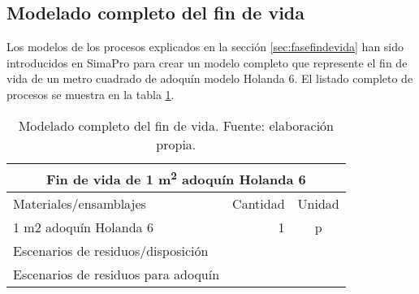 \subsection{Modelado completo del fin de vida}

Los modelos de los procesos explicados en la sección \ref{sec:fasefindevida} han sido introducidos en SimaPro para crear un modelo completo que represente el fin de vida de un metro cuadrado de adoquín modelo Holanda 6. El listado completo de procesos se muestra en la tabla \ref{modeladocompletofindevida}.

\begin{table}[!htb]
\centering
\begin{tabular}{p{8cm}rc}
\toprule
\multicolumn{3}{c}{Fin de vida de 1 \si{m^2} adoquín Holanda 6}\\
\midrule
Materiales/ensamblajes & Cantidad & Unidad\\
\midrule
1 m2 adoquín Holanda 6 & 1 & p\\
\midrule
Escenarios de residuos/disposición & & \\
\midrule
Escenarios de residuos para adoquín & & \\
\bottomrule
\end{tabular}
\caption[Modelado completo del fin de vida.]{Modelado completo del fin de vida. Fuente: elaboración propia.}
\label{modeladocompletofindevida}
\end{table}

